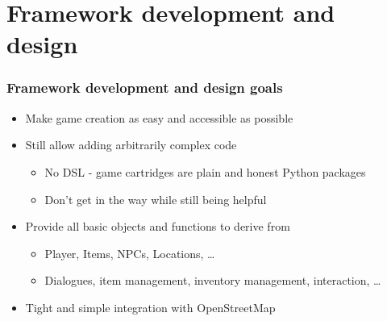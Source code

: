 \documentclass[aspectratio=43]{beamer}
\begin{document}

 \section{Framework development and design}

 \begin{frame}
  \frametitle{Framework development and design goals}

  \begin{itemize}
   \item{Make game creation as easy and accessible as possible}
   \item{Still allow adding arbitrarily complex code
    \begin{itemize}
     \item{No DSL - game cartridges are plain and honest Python packages}
     \item{Don't get in the way while still being helpful}
    \end{itemize}
   }
   \item{Provide all basic objects and functions to derive from
    \begin{itemize}
     \item{Player, Items, NPCs, Locations, …}
     \item{Dialogues, item management, inventory management, interaction, …}
    \end{itemize}
   }
   \item{Tight and simple integration with OpenStreetMap}
  \end{itemize}
 \end{frame}

\end{document}
